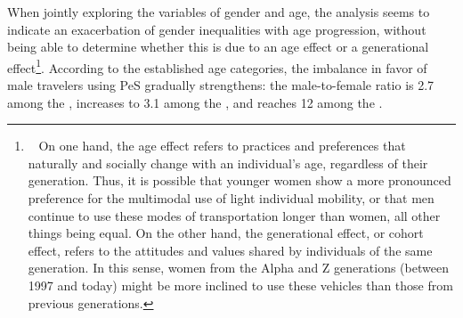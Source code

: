 \begin{refsegment}
When jointly exploring the variables of gender and age, the analysis seems to indicate an exacerbation of gender inequalities with age progression, without being able to determine whether this is due to an age effect or a generational effect\footnote{~
    On one hand, the age effect refers to practices and preferences that naturally and socially change with an individual's age, regardless of their generation. Thus, it is possible that younger women show a more pronounced preference for the multimodal use of light individual mobility, or that men continue to use these modes of transportation longer than women, all other things being equal. On the other hand, the generational effect, or cohort effect, refers to the attitudes and values shared by individuals of the same generation. In this sense, women from the Alpha and Z generations (between 1997 and today) might be more inclined to use these vehicles than those from previous generations.
}. According to the established age categories, the imbalance in favor of male travelers using \acrshort{PeS} gradually strengthens: the male-to-female ratio is 2.7 among the , increases to 3.1 among the , and reaches 12 among the . %


\end{refsegment}
